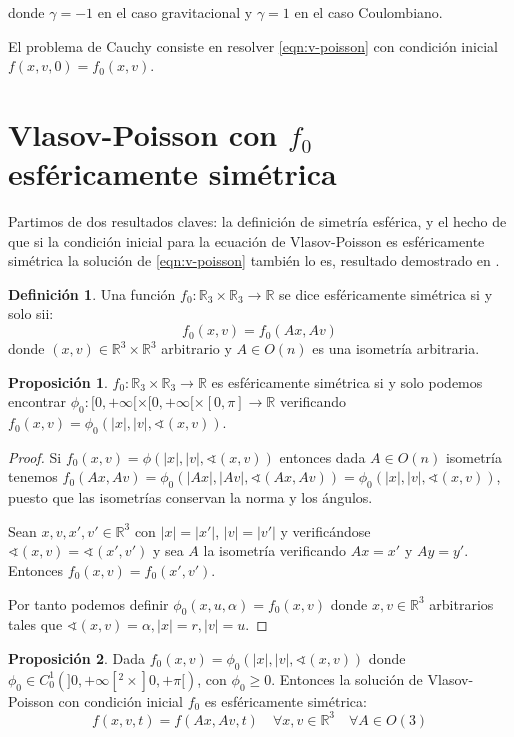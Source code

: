 \documentclass[a4paper,10pt]{scrartcl}
\theoremstyle{definition}
\newtheorem*{definition}{Definición}
\newtheorem{fact}{Proposición}
\numberwithin{equation}{section}
\begin{document}
donde $\gamma = -1$ en el caso gravitacional y $\gamma = 1$ en el caso Coulombiano.

El problema de Cauchy consiste en resolver \eqref{eqn:v-poisson} con condición inicial $f(x,v,0) = f_0(x,v)$.

\section{Vlasov-Poisson con $f_0$ esféricamente simétrica}
Partimos de dos resultados claves: la definición de simetría esférica, y el hecho de que si la condición inicial para la ecuación de Vlasov-Poisson es esféricamente simétrica la solución de \eqref{eqn:v-poisson} también lo es, resultado demostrado en \cite{Batt}.

\begin{definition}
 Una función $f_0:\mathbb{R}_3 \times \mathbb{R}_3 \rightarrow \mathbb{R}$ se dice esféricamente simétrica si y solo sii: 
 \[
 f_0(x,v) = f_0(Ax,Av)
 \] 
 donde $(x,v) \in \mathbb{R}^3\times \mathbb{R}^3$ arbitrario y $A\in O(n)$ es una isometría arbitraria.
\end{definition}

\begin{fact}
 $f_0:\mathbb{R}_3 \times \mathbb{R}_3  \rightarrow \mathbb{R}$ es esféricamente simétrica si y solo podemos encontrar $\phi_0:[0,+\infty[ \times [0,+\infty[ \times [0, \pi]  \rightarrow \mathbb{R}$ verificando $f_0(x,v) = \phi_0(|x|, |v|, \sphericalangle(x,v))$.
 \label{char:sph-symm}
\end{fact}

\begin{proof}

 Si $f_0(x,v) = \phi(|x|,|v|,\sphericalangle(x,v))$ entonces dada $A\in O(n)$ isometría tenemos $f_0(Ax, Av) = \phi_0(|Ax|, |Av|, \sphericalangle(Ax, Av)) = \phi_0(|x|, |v|, \sphericalangle(x,v))$, puesto que las isometrías conservan la norma y los ángulos.
 
 Sean $x,v,x',v'\in \mathbb{R}^3$ con $|x| = |x'|$, $|v| = |v'|$ y verificándose $\sphericalangle(x,v) = \sphericalangle(x',v')$ y sea $A$ la isometría verificando $Ax = x'$ y $Ay = y'$. Entonces $f_0(x,v) = f_0(x',v')$.
 
 Por tanto podemos definir $\phi_0(x,u,\alpha) = f_0(x,v)$ donde $x,v\in\mathbb{R}^3$ arbitrarios tales que $\sphericalangle(x,v) = \alpha, |x|=r, |v|=u$.
\end{proof}

\begin{fact}
Dada $f_0(x,v) = \phi_0(|x|, |v|, \sphericalangle(x,v))$ donde $\phi_0 \in C_0^1(]0,+\infty[^2 \times ]0,+\pi[)$, con $\phi_0\ge 0$. Entonces la solución de Vlasov-Poisson con condición inicial $f_0$ es esféricamente simétrica:
\begin{equation*}
f(x,v,t) = f(Ax, Av, t) \quad \forall x,v\in \mathbb{R}^3 \quad \forall A \in O(3)
\end{equation*}
\end{fact}
\end{document}
